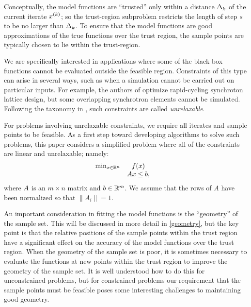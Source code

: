 \documentclass{article}
\begin{document}
Conceptually, the model functions are ``trusted'' only within a distance $ \Delta_k $ of the current iterate $x^{(k)}$; 
so the trust-region subproblem restricts the length of step $s$ to be no larger than $\Delta_k$.
To ensure that the model functions are good approximations of the true functions over the trust region, 
the sample points are typically chosen to lie within the trust-region.

%
We are specifically interested in applications where some of the black box functions cannot be evaluated outside the feasible region.  Constraints of this type can arise in several ways, such as when a simulation cannot be carried out on particular inputs.
For example, the authors of \cite{Padidar2021} optimize rapid-cycling synchroton lattice design,
but some overlapping synchrotron elements cannot be simulated.
Following the taxonomy in \cite{ledigabel2015taxonomy},  such constraints are called {\em unrelaxable}.

For problems involving unrelaxable constraints,  we require all iterates and sample points to be feasible.
As a first step toward developing algorithms to solve such problems, this paper considers a simplified problem where all of the constraints are linear and unrelaxable; namely:
\begin{align}
\begin{array}{ccl} \min_{x \in \mathbb R^n} & f(x) \\
& {A} x \le {b}, & 
\end{array}
\label{linear_dfo_problem}
\end{align}
where ${A}$ is an $m \times n$ matrix and ${b} \in \mathbb R^m$.
We assume that the rows of $A$ have been normalized so that $\|A_i\| = 1$.


An important consideration in fitting the model functions is the ``geometry'' of the sample set.
This will be discussed in more detail in \cref{geometry}, but the key point is that the relative positions of the sample points within the trust region have a significant effect on the accuracy of the model functions over the trust region.
When the geometry of the sample set is poor, it is sometimes necessary to evaluate the functions at new points within the trust region to improve the geometry of the sample set.
It is well understood how to do this for unconstrained problems, but for constrained problems
our requirement that the sample points must be feasible poses some interesting challenges to maintaining good geometry.   
\end{document}
